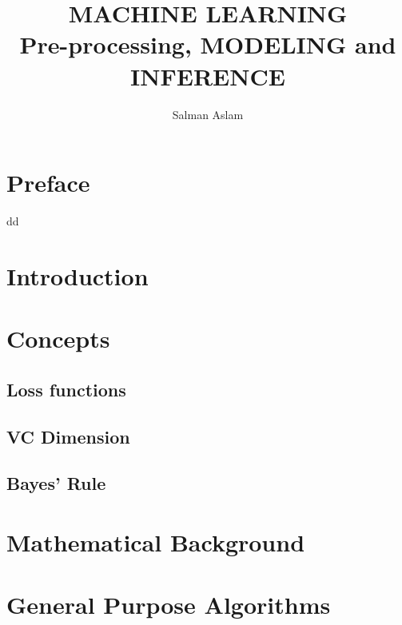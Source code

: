 \documentclass{book}
\title{MACHINE LEARNING\\Pre-processing, MODELING and INFERENCE}
\author{Salman Aslam}
\date{}
\begin{document}
\maketitle

\chapter*{Preface}

dd

\tableofcontents



\chapter{Introduction}

\chapter{Concepts}
\section{Loss functions}
\section{VC Dimension}
\section{Bayes' Rule}

\chapter{Mathematical Background}

\chapter{General Purpose Algorithms}






\end{document}
